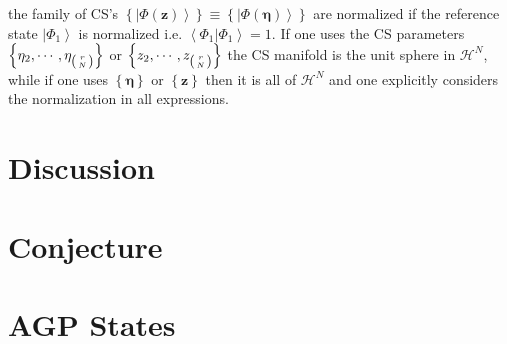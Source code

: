 \documentclass[aps,preprint]{revtex4}%
\begin{document}
the family of CS's $\left\{  \left\vert \Phi\left(  \mathbf{z}\right)
\right\rangle \right\}  \equiv\left\{  \left\vert \Phi\left(  \mathbf{\eta
}\right)  \right\rangle \right\}  $ are normalized if the reference state
$\left\vert \Phi_{1}\right\rangle $ is normalized i.e. $\left\langle \left.
\Phi_{1}\right\vert \Phi_{1}\right\rangle =1.$ If one uses the CS parameters
$\left\{  \eta_{2},\cdots,\eta_{\left(
\genfrac{}{}{0pt}{}{r}{N}%
\right)  }\right\}  $ or $\left\{  z_{2},\cdots,z_{\left(
\genfrac{}{}{0pt}{}{r}{N}%
\right)  }\right\}  $ the CS manifold is the unit sphere in $\mathcal{H}^{N}$,
while if one uses $\left\{  \mathbf{\eta}\right\}  $ or $\left\{
\mathbf{z}\right\}  $ then it is all of $\mathcal{H}^{N}$ and one explicitly
considers the normalization in all expressions.

\section{Discussion\label{discussion}}

\appendix

\section{Conjecture\label{conjecture}}

\section{AGP States \label{agp}}



\end{document}
